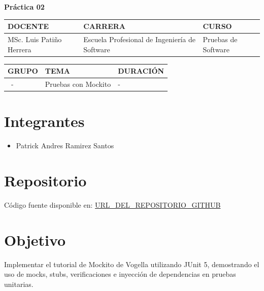 \documentclass{article}
\newcommand{\csdocente}{MSc. Luis Pati\~no Herrera}
\newcommand{\cscurso}{Pruebas de Software}
\newcommand{\csescuela}{Escuela Profesional de Ingenier\'ia de Software}
\newcommand{\cspracnr}{02}
\newcommand{\cstema}{Pruebas con Mockito}
\begin{document}
    \vspace*{10px}

    \begin{center}
        \fontsize{17}{17} \textbf{ Pr\'actica \cspracnr}
    \end{center}

\renewcommand{\arraystretch}{1.5}
\begin{table}[h]
    \begin{tabular}{|x{4.7cm}|x{4.8cm}|x{4.8cm}|}
        \hline
        \textbf{DOCENTE} & \textbf{CARRERA}  & \textbf{CURSO}   \\
        \hline
        \csdocente & \csescuela & \cscurso    \\
        \hline
    \end{tabular}
\end{table}

\begin{table}[h]
    \begin{tabular}{|x{4.7cm}|x{4.8cm}|x{4.8cm}|}
        \hline
        \textbf{GRUPO} & \textbf{TEMA}  & \textbf{DURACI\'ON}   \\
        \hline
        \ - & \cstema & -  \\
        \hline
    \end{tabular}
\end{table}
\renewcommand{\arraystretch}{1}

    \section*{Integrantes}
    \begin{itemize}
        \item Patrick Andres Ramirez Santos
    \end{itemize}

    \section*{Repositorio}
    C\'odigo fuente disponible en: \url{URL\_DEL\_REPOSITORIO\_GITHUB}

    \tableofcontents

\newpage

\section{Objetivo}
Implementar el tutorial de Mockito de Vogella utilizando JUnit 5, demostrando el uso de mocks, stubs, verificaciones e inyecci\'on de dependencias en pruebas unitarias.
\end{document}
